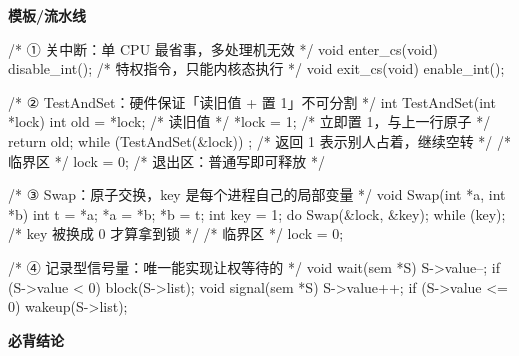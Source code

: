 \documentclass[10pt,a4paper]{ctexart}
\begin{document}
\textbf{模板/流水线}

\begin{codebox}
/* ① 关中断：单 CPU 最省事，多处理机无效 */
void enter_cs(void) { disable_int(); }   /* 特权指令，只能内核态执行 */
void exit_cs(void)  { enable_int();  }

/* ② TestAndSet：硬件保证「读旧值 + 置 1」不可分割 */
int TestAndSet(int *lock) {
    int old = *lock;      /* 读旧值 */
    *lock = 1;            /* 立即置 1，与上一行原子 */
    return old;
}
while (TestAndSet(&lock)) ;   /* 返回 1 表示别人占着，继续空转 */
/* 临界区 */
lock = 0;                     /* 退出区：普通写即可释放 */

/* ③ Swap：原子交换，key 是每个进程自己的局部变量 */
void Swap(int *a, int *b) { int t = *a; *a = *b; *b = t; }
int key = 1;
do { Swap(&lock, &key); } while (key);   /* key 被换成 0 才算拿到锁 */
/* 临界区 */
lock = 0;

/* ④ 记录型信号量：唯一能实现让权等待的 */
void wait(sem *S)  { S->value--; if (S->value < 0) block(S->list); }
void signal(sem *S){ S->value++; if (S->value <= 0) wakeup(S->list); }
\end{codebox}




\textbf{必背结论}
\end{document}
